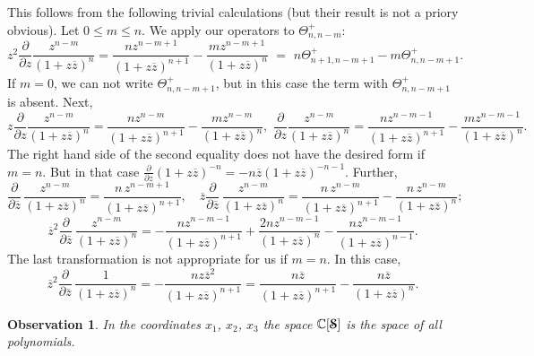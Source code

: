 \documentclass[10pt,a4paper]{amsart}
\newcounter{sec}
\newtheorem{observation}[theorem]{Observation}
\def\le{\leqslant}
\def\cS{\boldsymbol{\EuScript S}}
\def\C {{\mathbb C }}
\def\ov{\overline}
\def\sm{\smallskip}
\begin{document}
\sm

This follows from the following trivial calculations 
(but their result is not a priory obvious). Let $0\le m \le n$. We apply our operators
to $\Theta^+_{n,n-m}$:
$$
z^2 \frac{\partial}{\partial z} \frac{z^{n-m}} {(1+z \ov z)^n}
= \frac{n z^{n-m+1}}{(1+z\ov z)^{n+1}}-
\frac{m z^{n-m+1}}{(1+z\ov z)^{n}}\,\,
=\,\, n\Theta^+_{n+1,n-m+1}-m\Theta^+_{n,n-m+1}.
$$
If $m=0$, we can not write $\Theta^+_{n,n-m+1}$,
but in this case the term with $\Theta^+_{n,n-m+1}$
is absent.
 Next,
$$
z \frac{\partial}{\partial z} \frac{z^{n-m}} {(1+z \ov z)^n}
\!=\! \frac{n z^{n-m}}{(1+z\ov z)^{n+1}}-
\frac{m z^{n-m}}{(1+z\ov z)^{n}},
\,\, 
 \frac{\partial}{\partial z} \frac{z^{n-m}} {(1+z \ov z)^n}
\!=\! \frac{n z^{n-m-1}}{(1+z\ov z)^{n+1}}-
\frac{m z^{n-m-1}}{(1+z\ov z)^{n}}.
$$
The right hand side of the second equality does not have the desired form if $m=n$. But in that case $\frac{\partial}{\partial z} (1+z \ov z)^{-n}=-n \ov z (1+z \ov z)^{-n-1}$. Further, 
$$
\frac{\partial}{\partial \ov z}\,
\frac{z^{n-m}}
{(1+z \ov z)^{n}}=\frac{n\,z^{n-m+1}}
{(1+z \ov z)^{n+1}},\quad 
\ov z\frac{\partial}{\partial \ov z}\,
\frac{z^{n-m}}
{(1+z \ov z)^{n}}=\frac{n\,z^{n-m}}{(1+z \ov z)^{n+1}}-\frac{n\,z^{n-m}}{(1+z \ov z)^{n}};
$$
$$
\ov z^2\frac{\partial}{\partial \ov z}\,
\frac{z^{n-m}}
{(1+z \ov z)^{n}}=-\frac{n z^{n-m-1}}{(1+z \ov z)^{n+1}}+
\frac{2n z^{n-m-1}}{(1+z \ov z)^{n}}-
\frac{n z^{n-m-1}}{(1+z \ov z)^{n-1}}.
$$
The last transformation is not appropriate for us
if $m=n$. In this case,
$$
\ov z^2\frac{\partial}{\partial \ov z}\,
\frac{1}
{(1+z \ov z)^{n}}=-\frac{n z \ov z^2}{(1+z \ov z)^{n+1}}
=\frac{n \ov z}{(1+z \ov z)^{n+1}}- \frac{n \ov z}{(1+z \ov z)^{n}}.
$$ 

\begin{observation}
\label{obs:3}
 In the coordinates $x_1$, $x_2$, $x_3$ the space $\C[\cS]$ is the space of all polynomials. 
\end{observation}
\end{document}
